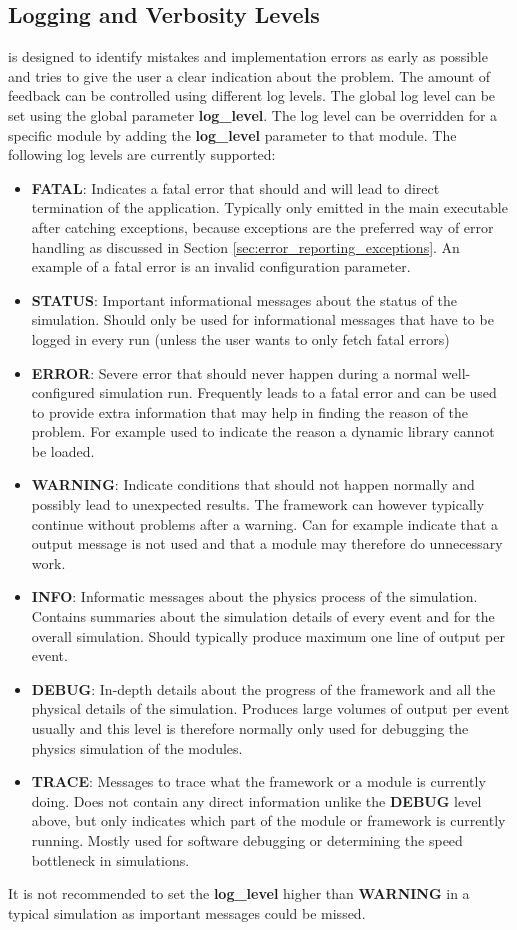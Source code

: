\subsection{Logging and Verbosity Levels}
\label{sec:logging_verbosity}
\apsq is designed to identify mistakes and implementation errors as early as possible and tries to give the user a clear indication about the problem. The amount of feedback can be controlled using different log levels. The global log level can be set using the global parameter \textbf{log\_level}. The log level can be overridden for a specific module by adding the \textbf{log\_level} parameter to that module. The following log levels are currently supported:
\begin{itemize}
\item \textbf{FATAL}: Indicates a fatal error that should and will lead to direct termination of the application. Typically only emitted in the main executable after catching exceptions, because exceptions are the preferred way of error handling as discussed in Section \ref{sec:error_reporting_exceptions}. An example of a fatal error is an invalid configuration parameter.
\item \textbf{STATUS}: Important informational messages about the status of the simulation. Should only be used for informational messages that have to be logged in every run (unless the user wants to only fetch fatal errors)
\item \textbf{ERROR}: Severe error that should never happen during a normal well-configured simulation run. Frequently leads to a fatal error and can be used to provide extra information that may help in finding the reason of the problem. For example used to indicate the reason a dynamic library cannot be loaded.
\item \textbf{WARNING}: Indicate conditions that should not happen normally and possibly lead to unexpected results. The framework can however typically continue without problems after a warning. Can for example indicate that a output message is not used and that a module may therefore do unnecessary work.
\item \textbf{INFO}: Informatic messages about the physics process of the simulation. Contains summaries about the simulation details of every event and for the overall simulation. Should typically produce maximum one line of output per event.
\item \textbf{DEBUG}: In-depth details about the progress of the framework and all the physical details of the simulation. Produces large volumes of output per event usually and this level is therefore normally only used for  debugging the physics simulation of the modules.
\item \textbf{TRACE}: Messages to trace what the framework or a module is currently doing. Does not contain any direct information unlike the \textbf{DEBUG} level above, but only indicates which part of the module or framework is currently running. Mostly used for software debugging or determining the speed bottleneck in simulations.
\end{itemize}
It is not recommended to set the \textbf{log\_level} higher than \textbf{WARNING} in a typical simulation as important messages could be missed.

